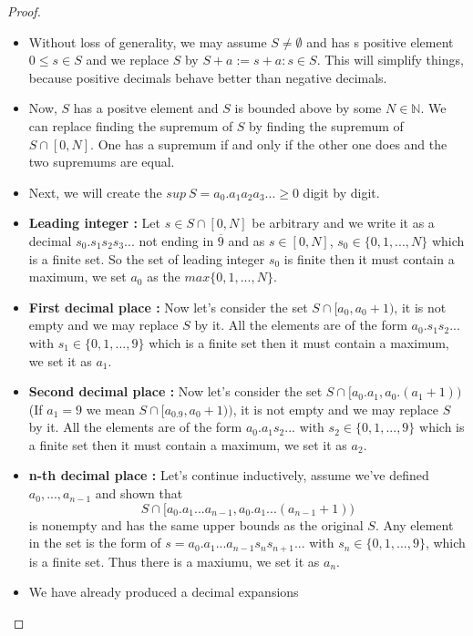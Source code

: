 \documentclass[a4paper]{article}
\def\nn{{\mathbb N}}
\begin{document}
\begin{proof}
    \begin{itemize}
        \item Without loss of generality, we may assume $S\neq \emptyset$ and has s positive element $0\leq s \in S$ and we replace $S$ by $S+a:={s+a: s\in S}$. This will simplify things, because positive decimals behave better than negative decimals.
        \item Now, $S$ has a positve element and $S$ is bounded above by some $N \in \nn$. We can replace finding the supremum of $S$ by finding the supremum of $S\cap[0,N]$. One has a supremum if and only if the other one does and the two supremums are equal.
        \item Next, we will create the $sup \:S=a_0.a_1a_2a_3...\geq 0$ digit by digit.
        \item \textsf{\textbf{Leading integer :}} Let $s\in S\cap [0,N]$ be arbitrary and we write it as a decimal $s_0.s_1s_2s_3...$ not ending in $\overline{9}$ and as $s\in [0,N]$, $s_0\in \{0,1,...,N\}$ which is a finite set. So the set of leading integer $s_0$ is finite then it must contain a maximum, we set $a_0$ as the $max\{0,1,...,N\}$.
        \item \textsf{\textbf{First decimal place :}} Now let's consider the set $S\cap [a_0,a_0+1)$, it is not empty and we may replace $S$ by it. All the elements are of the form $a_0.s_1s_2...$ with $s_1\in \{0,1,...,9\}$ which is a finite set then it must contain a maximum, we set it as $a_1$.
        \item \textsf{\textbf{Second decimal place :}} Now let's consider the set $S\cap [a_0.a_1,a_0.(a_1+1))$(If $a_1=9$ we mean $S\cap[a_0.9,a_0+1))$, it is not empty and we may replace $S$ by it. All the elements are of the form $a_0.a_1s_2...$ with $s_2\in \{0,1,...,9\}$ which is a finite set then it must contain a maximum, we set it as $a_2$. 
        \item \textsf{\textbf{n-th decimal place :}} Let's continue inductively, assume we've defined $a_0,...,a_{n-1}$ and shown that
            \begin{equation*}
                S\cap [a_0.a_1...a_{n-1},a_0.a_1...(a_{n-1}+1))
            \end{equation*}
        is nonempty and has the same upper bounds as the original $S$. Any element in the set is the form of $s=a_0.a_1...a_{n-1}s_ns_{n+1}...$ with $s_n\in\{0,1,...,9\}$, which is a finite set. Thus there is a maxiumu, we set it as $a_n$.
        \item We have already produced a decimal expansions

\end{itemize}
\end{proof}
\end{document}
